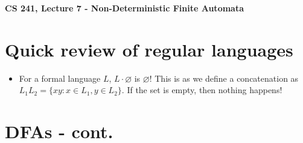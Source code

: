 \documentclass[12pt]{article}
\author{Clement Tsang}
\begin{document}
\begin{center}
\Large\textbf{CS 241, Lecture 7 - Non-Deterministic Finite Automata}
\end{center}

\section{Quick review of regular languages}
\begin{itemize}
    \item For a formal language $L$, $L \cdot \varnothing$ is $\varnothing$!  This is as we define a concatenation as $L_1L_2 = \{xy : x \in L_1, y \in L_2\}$.  If the set is empty, then nothing happens!
\end{itemize}

\section{DFAs - cont.}
\end{document}
